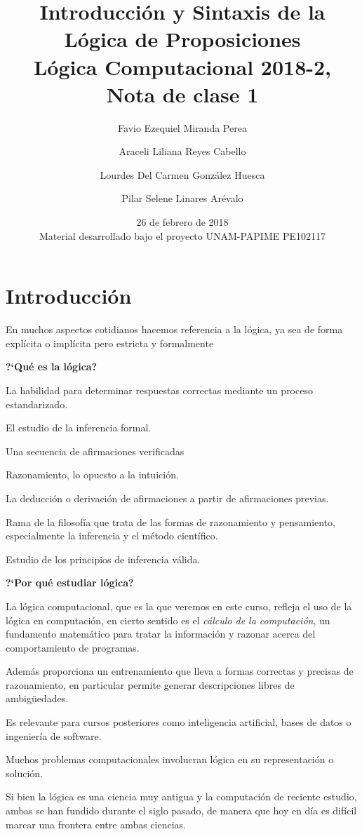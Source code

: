 \documentclass[11pt,letterpaper]{article}
\title{Introducci\'on y Sintaxis de la L\'ogica de Proposiciones \\
Lógica Computacional 2018-2, Nota de clase 1}
\author{Favio Ezequiel Miranda Perea\and Araceli Liliana Reyes Cabello\and
Lourdes Del Carmen Gonz\'alez Huesca \and Pilar Selene Linares Ar\'evalo}
\date{26 de febrero de 2018 \\
Material desarrollado bajo el proyecto UNAM-PAPIME PE102117}
\begin{document}
\maketitle

\section{Introducci\'on}
En muchos aspectos cotidianos hacemos referencia a la l\'ogica, ya sea de forma 
expl\'icita o impl\'icita pero estricta y formalmente 
\begin{center}
 \textbf{?`Qué es la l\'ogica?}
\end{center}
\bi
\item La habilidad para determinar respuestas correctas mediante un proceso
  estandarizado.
\item El estudio de la inferencia formal.
\item Una secuencia de afirmaciones verificadas
\item Razonamiento, lo opuesto a la intuici\'on.
\item La deducción o derivación de afirmaciones a partir de afirmaciones 
previas.
\item Rama de la filosof\'ia que trata de las formas de razonamiento y 
pensamiento, especialmente la inferencia y el método científico.
\item Estudio de los principios de inferencia v\'alida.
\ei
 
\begin{center}
 \textbf{?`Por qué estudiar l\'ogica?}
\end{center}
\bi
 \item La l\'ogica computacional, que es la que veremos en este curso, 
  refleja el uso de la l\'ogica en computación, en cierto sentido es el 
 \emph{cálculo de la computación}, un fundamento matemático para tratar la 
  información y razonar acerca del comportamiento de programas.
 \item Además proporciona un entrenamiento que lleva a formas correctas y 
  precisas de razonamiento, en particular permite generar descripciones libres 
  de ambigüedades.
 \item Es relevante para cursos posteriores como inteligencia artificial, bases 
  de datos o ingeniería de software.
 \item Muchos problemas computacionales involucran l\'ogica en su representación
  o solución.
 \item Si bien la l\'ogica es una ciencia muy antigua y la computación de 
  reciente estudio, ambas se han fundido durante el siglo pasado, de manera 
  que hoy en d\'ia es difícil marcar una frontera entre ambas ciencias. 
\ei
\end{document}
